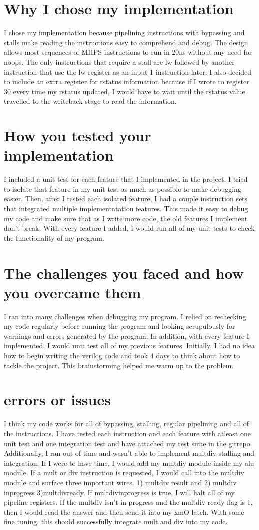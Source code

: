 \documentclass[letterpaper]{article} %
\begin{document}
\section{Why I chose my implementation}
    I chose my implementation because pipelining instructions with bypassing and stalls make reading the instructions easy to comprehend and debug. The
    design allows most sequences of MIIPS instructions to run in 20ns without any need for noops. The only instructions that require a stall are
    lw followed by another instruction that use the lw register as an input 1 instruction later. I also decided to include an extra register for rstatus
    information because if I wrote to register 30 every time my rstatus updated, I would have to wait until the rstatus value travelled to the writeback stage
    to read the information.
\section{How you tested your implementation}
    I included a unit test for each feature that I implemented in the project. I tried to isolate that feature in my unit test as much as possible to 
    make debugging easier. Then, after I tested each isolated feature, I had a couple instruction sets that integrated multiple implementatation features.
    This made it easy to debug my code and make sure that as I write more code, the old features I implement don't break. With every feature I added,
    I would run all of my unit tests to check the functionality of my program. 
\section{The challenges you faced and how you overcame them}
    I ran into many challenges when debugging my program. I relied on rechecking my code regularly before running the program and looking scrupulously for 
    warnings and errors generated by the program. In addition, with every feature I implemented, I would unit test all of my previous features. 
    Initially, I had no idea how to begin writing the verilog code and took 4 days to think about how to tackle the project. This brainstorming helped me warm
    up to the problem. 
\section{errors or issues}
    I think my code works for all of bypassing, stalling, regular pipelining and all of the instructions. I have tested each instruction and each feature with atleast one unit test and one integration test and have attached my test suite in the gitrepo. Additionally, I ran out of time and wasn't able to implement multdiv stalling and integration. If I were to have time, I would add my multdiv module inside my alu module. If a mult or div instruction is requested, I would call into the multdiv module and surface three important wires. 1) multdiv result and 2) multdiv inprogress 3)multdivready. If multdivinprogress is true, I will halt all of my pipeline registers. If the multdiv isn't in progress and the multdiv ready flag is 1, then I would read the answer and then send it into my xmO latch. With some fine tuning, this should successfully integrate mult and div into my code.
\end{document}
